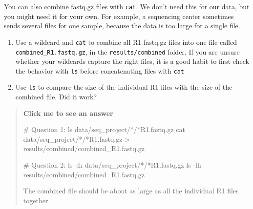 \documentclass[
  letterpaper,
  DIV=11,
  numbers=noendperiod]{scrreprt}
\newenvironment{Shaded}{}{}
\newcommand{\AttributeTok}[1]{\textcolor[rgb]{0.84,0.23,0.29}{#1}}
\newcommand{\CommentTok}[1]{\textcolor[rgb]{0.42,0.45,0.49}{#1}}
\newcommand{\FunctionTok}[1]{\textcolor[rgb]{0.44,0.26,0.76}{#1}}
\newcommand{\NormalTok}[1]{\textcolor[rgb]{0.14,0.16,0.18}{#1}}
\newcommand{\OperatorTok}[1]{\textcolor[rgb]{0.14,0.16,0.18}{#1}}
\newcommand{\PreprocessorTok}[1]{\textcolor[rgb]{0.84,0.23,0.29}{#1}}
\providecommand{\tightlist}{%
  \setlength{\itemsep}{0pt}\setlength{\parskip}{0pt}}
\begin{document}
\begin{tcolorbox}[enhanced jigsaw, coltitle=black, breakable, titlerule=0mm, colback=white, rightrule=.15mm, bottomrule=.15mm, toprule=.15mm, colframe=quarto-callout-color-frame, colbacktitle=quarto-callout-color!10!white, bottomtitle=1mm, opacitybacktitle=0.6, toptitle=1mm, leftrule=.75mm, arc=.35mm, title=\textcolor{quarto-callout-color}{\faInfo}\hspace{0.5em}{Exercise}, left=2mm, opacityback=0]

You can also combine fastq.gz files with \texttt{cat}. We don't need
this for our data, but you might need it for your own. For example, a
sequencing center sometimes sends several files for one sample, because
the data is too large for a single file.

\begin{enumerate}
\def\labelenumi{\arabic{enumi}.}
\tightlist
\item
  Use a wildcard and \texttt{cat} to combine all R1 fastq.gz files into
  one file called \texttt{combined\_R1.fastq.gz}, in the
  \texttt{results/combined} folder. If you are unsure whether your
  wildcards capture the right files, it is a good habit to first check
  the behavior with \texttt{ls} before concatenating files with
  \texttt{cat}
\item
  Use \texttt{ls} to compare the size of the individual R1 files with
  the size of the combined file. Did it work?
\end{enumerate}

\begin{quote}
\textbf{Click me to see an answer}

\begin{Shaded}
\begin{Highlighting}[]
\CommentTok{\# Question 1:}
\FunctionTok{ls}\NormalTok{ data/seq\_project/}\PreprocessorTok{*}\NormalTok{/}\PreprocessorTok{*}\NormalTok{R1.fastq.gz}
\FunctionTok{cat}\NormalTok{ data/seq\_project/}\PreprocessorTok{*}\NormalTok{/}\PreprocessorTok{*}\NormalTok{R1.fastq.gz }\OperatorTok{\textgreater{}}\NormalTok{ results/combined/combined\_R1.fastq.gz}

\CommentTok{\# Question 2:}
\FunctionTok{ls} \AttributeTok{{-}lh}\NormalTok{ data/seq\_project/}\PreprocessorTok{*}\NormalTok{/}\PreprocessorTok{*}\NormalTok{R1.fastq.gz}
\FunctionTok{ls} \AttributeTok{{-}lh}\NormalTok{ results/combined/combined\_R1.fastq.gz}
\end{Highlighting}
\end{Shaded}

The combined file should be about as large as all the individual R1
files together.
\end{quote}

\end{tcolorbox}
\end{document}
